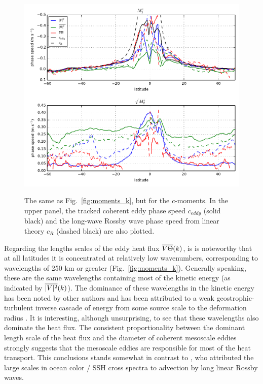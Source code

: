 \documentclass[10pt]{article}
\newcommand{\ol}{\ensuremath{\overline}}
\begin{document}
\begin{figure}[t]
  \noindent\includegraphics{../figures/moments_c.pdf}\\
  \caption{The same as Fig.~\ref{fig:moments_k}, but for the $c$-moments. In the upper panel, the tracked coherent eddy phase speed $c_{eddy}$ (solid black) and the long-wave Rossby wave phase speed from linear theory $c_R$ (dashed black) are also plotted. }
  \label{fig:moments_c}
\end{figure}

Regarding the lengths scales of the eddy heat flux $\ol{V\Theta}(k)$, is is noteworthy that at all latitudes it is concentrated at relatively low wavenumbers, corresponding to wavelengths of 250 km or greater (Fig.~\ref{fig:moments_k}). Generally speaking, these are the same wavelengths containing most of the kinetic energy (as indicated by $\ol{|V|^2}(k)$). The dominance of these wavelengths in the kinetic energy has been noted by other authors \citep[e.g.][]{Wunsch2010,WorthamWunsch2014} and has been attributed to a weak geostrophic-turbulent inverse cascade of energy from some source scale to the deformation radius \citep{Stammer1997,ArbicFlierl2004b,ScottWang2005,TullochEtAl2011}. It is interesting, although unsurprising, to see that these wavelengths also dominate the heat flux. The consistent proportionality between the dominant length scale of the heat flux and the diameter of coherent mesoscale eddies strongly suggests that the mesoscale eddies are responsible for most of the heat transport. This conclusions stands somewhat in contrast to \citet{KillworthEtAl2004}, who attributed the large scales in ocean color / SSH cross spectra to advection by long linear Rossby waves.
\end{document}
